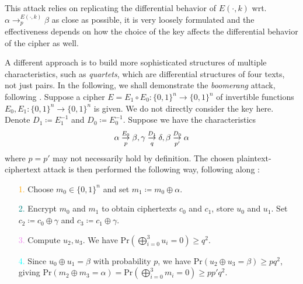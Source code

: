\documentclass[10pt]{amsart}
\theoremstyle{definition}
\theoremstyle{remark}
\begin{document}
    \phantom{}

    This attack relies on replicating the differential behavior of \(E(\cdot, k)\) wrt. \(\alpha \to_p^{E(\cdot, k)} \beta\) as close as possible, it is very loosely formulated and the effectiveness depends on how the choice of the key affects the differential behavior of the cipher as well.
    
    A different approach is to build more sophisticated structures of multiple characteristics, such as \emph{quartets}, which are differential structures of four texts, not just pairs. In the following, we shall demonstrate the \emph{boomerang} attack, following \cite[pp. 162-164]{Knudsen}. Suppose a cipher \(E = E_1 \circ E_0\colon \{0, 1\}^n \to \{0, 1\}^n\) of invertible functions \(E_0, E_1\colon \{0, 1\}^n \to \{0, 1\}^n\) is given. We do not directly consider the key here. Denote \(D_1 \coloneqq E_1^{-1}\) and \(D_0 \coloneqq E_0^{-1}\). Suppose we have the characteristics
    \begin{align}
        \alpha \overunderset{E_0}{p}{\to} \beta, \gamma \overunderset{D_1}{q}{\to} \delta, \beta \overunderset{D_0}{p'}{\to} \alpha
    \end{align}
    where \(p = p'\) may not necessarily hold by definition. The chosen plaintext-ciphertext attack is then performed the following way, following along :
    \begin{enumerate}[wide]
        \item[\textcolor{orange}{1.}] Choose \(m_0 \in \{0, 1\}^n\) and set \(m_1 \coloneqq m_0 \oplus \alpha\).
        \item[\textcolor{teal}{2.}] Encrypt \(m_0\) and \(m_1\) to obtain ciphertexts \(c_0\) and \(c_1\), store \(u_0\) and \(u_1\). Set \(c_2 \coloneqq c_0 \oplus \gamma\) and \(c_3 \coloneqq c_1 \oplus \gamma\).
        \item[\textcolor{violet}{3.}] Compute \(u_2, u_3\). We have \(\text{Pr}(\bigoplus_{i=0}^3 u_i = 0) \geq q^2\).
        \item[\textcolor{cyan}{4.}] Since \(u_0 \oplus u_1 = \beta\) with probability \(p\), we have \(\text{Pr}(u_2 \oplus u_3 = \beta) \geq pq^2\), giving \(\text{Pr}(m_2 \oplus m_3 = \alpha) = \text{Pr}(\bigoplus_{i=0}^3 m_i = 0) \geq pp'q^2\).
    \end{enumerate}
\end{document}
